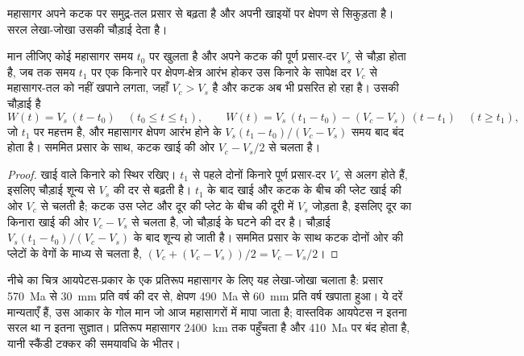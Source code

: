 महासागर अपने कटक पर समुद्र-तल प्रसार से बढ़ता है और अपनी खाइयों पर क्षेपण से सिकुड़ता है।
सरल लेखा-जोखा उसकी चौड़ाई देता है।

\begin{proposition}[एक चक्र के दौरान महासागर की चौड़ाई]\label{prop:b2:wilson-cycle:width}
मान लीजिए कोई महासागर समय $t_0$ पर खुलता है और अपने कटक की पूर्ण प्रसार-दर $V_s$ से चौड़ा होता है, जब तक
समय $t_1$ पर एक किनारे पर क्षेपण-क्षेत्र आरंभ होकर उस किनारे के सापेक्ष दर $V_c$ से
महासागर-तल को नहीं खपाने लगता, जहाँ $V_c > V_s$ है और कटक अब भी प्रसरित हो रहा है। उसकी चौड़ाई है
\[
  W(t) = V_s\,(t - t_0) \quad (t_0 \le t \le t_1), \qquad
  W(t) = V_s\,(t_1 - t_0) - (V_c - V_s)\,(t - t_1) \quad (t \ge t_1),
\]
जो $t_1$ पर महत्तम है, और महासागर क्षेपण आरंभ होने के $V_s(t_1 - t_0)/(V_c - V_s)$ समय बाद
बंद होता है। सममित प्रसार के साथ, कटक खाई की ओर $V_c - V_s/2$ से चलता है।
\end{proposition}

\begin{proof}
खाई वाले किनारे को स्थिर रखिए। $t_1$ से पहले दोनों किनारे पूर्ण
प्रसार-दर $V_s$ से अलग होते हैं, इसलिए चौड़ाई शून्य से $V_s$ की दर से बढ़ती है। $t_1$ के बाद
खाई और कटक के बीच की प्लेट खाई की ओर $V_c$ से चलती है; कटक उस प्लेट और दूर की प्लेट के बीच की दूरी में
$V_s$ जोड़ता है, इसलिए दूर का किनारा खाई की ओर $V_c - V_s$ से चलता है,
जो चौड़ाई के घटने की दर है। चौड़ाई $V_s(t_1 - t_0)/(V_c -
V_s)$ के बाद शून्य हो जाती है। सममित प्रसार के साथ कटक दोनों ओर की प्लेटों के वेगों के
माध्य से चलता है, $(V_c + (V_c - V_s))/2 = V_c - V_s/2$।
\end{proof}

नीचे का चित्र आयपेटस-प्रकार के एक प्रतिरूप महासागर के लिए यह लेखा-जोखा चलाता है: प्रसार
\qty{570}{Ma} से \qty{30}{mm} प्रति वर्ष की दर से, क्षेपण \qty{490}{Ma} से \qty{60}{mm} प्रति
वर्ष खपाता हुआ। ये दरें मान्यताएँ हैं, उस आकार के गोल मान जो आज महासागरों में मापा जाता है;
वास्तविक आयपेटस न इतना सरल था न इतना सुज्ञात। प्रतिरूप महासागर \qty{2400}{km} तक पहुँचता है
और \qty{410}{Ma} पर बंद होता है, यानी स्कैंडी टक्कर की समयावधि के भीतर।

